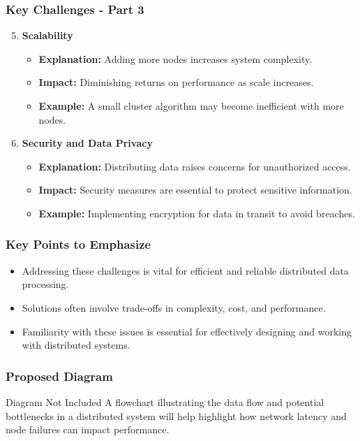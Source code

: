 \documentclass[aspectratio=169]{beamer}
\begin{document}
\begin{frame}[fragile]
    \frametitle{Key Challenges - Part 3}
    \begin{enumerate}
        \setcounter{enumi}{4}
        \item \textbf{Scalability}
            \begin{itemize}
                \item \textbf{Explanation:} Adding more nodes increases system complexity.
                \item \textbf{Impact:} Diminishing returns on performance as scale increases.
                \item \textbf{Example:} A small cluster algorithm may become inefficient with more nodes.
            \end{itemize}
        
        \item \textbf{Security and Data Privacy}
            \begin{itemize}
                \item \textbf{Explanation:} Distributing data raises concerns for unauthorized access.
                \item \textbf{Impact:} Security measures are essential to protect sensitive information.
                \item \textbf{Example:} Implementing encryption for data in transit to avoid breaches.
            \end{itemize}
    \end{enumerate}
\end{frame}

\begin{frame}[fragile]
    \frametitle{Key Points to Emphasize}
    \begin{itemize}
        \item Addressing these challenges is vital for efficient and reliable distributed data processing.
        \item Solutions often involve trade-offs in complexity, cost, and performance.
        \item Familiarity with these issues is essential for effectively designing and working with distributed systems.
    \end{itemize}
\end{frame}

\begin{frame}[fragile]
    \frametitle{Proposed Diagram}
    \begin{block}{Diagram Not Included}
        A flowchart illustrating the data flow and potential bottlenecks in a distributed system will help highlight how network latency and node failures can impact performance.
    \end{block}
\end{frame}
\end{document}

